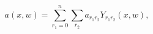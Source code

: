 \begin{equation} 
a(x,w)=\sum_{r_{1}=0}^{n}\sum_{r_{2}}
a_{r_{1}r_{2}}
Y_{r_{1}r_{2}}(x,w), 
\end{equation} 
